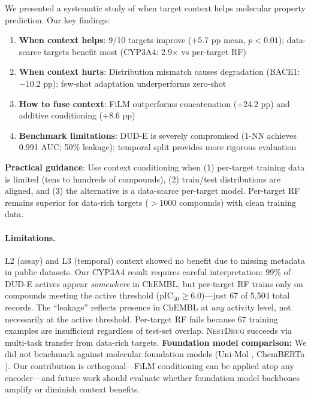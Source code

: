 \documentclass{article}
\newcommand{\methodname}{\textsc{NestDrug}}
\begin{document}
We presented a systematic study of when target context helps molecular property prediction. Our key findings:

\begin{enumerate}[noitemsep,topsep=2pt]
\item \textbf{When context helps}: 9/10 targets improve (+5.7 pp mean, $p < 0.01$); data-scarce targets benefit most (CYP3A4: 2.9$\times$ vs per-target RF)
\item \textbf{When context hurts}: Distribution mismatch causes degradation (BACE1: $-$10.2 pp); few-shot adaptation underperforms zero-shot
\item \textbf{How to fuse context}: FiLM outperforms concatenation (+24.2 pp) and additive conditioning (+8.6 pp)
\item \textbf{Benchmark limitations}: DUD-E is severely compromised (1-NN achieves 0.991 AUC; 50\% leakage); temporal split provides more rigorous evaluation
\end{enumerate}

\textbf{Practical guidance}: Use context conditioning when (1) per-target training data is limited (tens to hundreds of compounds), (2) train/test distributions are aligned, and (3) the alternative is a data-scarce per-target model. Per-target RF remains superior for data-rich targets ($>$1000 compounds) with clean training data.

\paragraph{Limitations.} L2 (assay) and L3 (temporal) context showed no benefit due to missing metadata in public datasets. Our CYP3A4 result requires careful interpretation: 99\% of DUD-E actives appear \textit{somewhere} in ChEMBL, but per-target RF trains only on compounds meeting the active threshold (pIC$_{50} \geq 6.0$)---just 67 of 5,504 total records. The ``leakage'' reflects presence in ChEMBL at \textit{any} activity level, not necessarily at the active threshold. Per-target RF fails because 67 training examples are insufficient regardless of test-set overlap. \methodname{} succeeds via multi-task transfer from data-rich targets. \textbf{Foundation model comparison:} We did not benchmark against molecular foundation models (Uni-Mol \citep{zhou_2023_unimol}, ChemBERTa \citep{chithrananda_2020_chemberta}). Our contribution is orthogonal---FiLM conditioning can be applied atop any encoder---and future work should evaluate whether foundation model backbones amplify or diminish context benefits.
\end{document}
